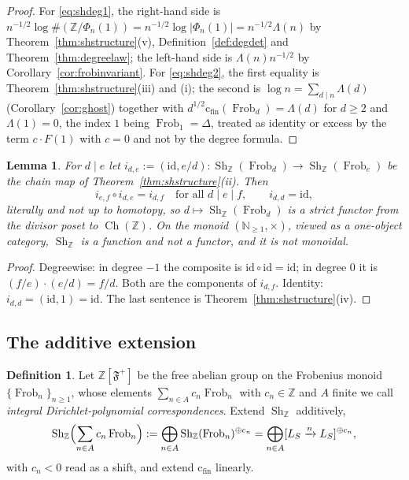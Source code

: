 \documentclass[11pt]{amsart}
\newtheorem{lemma}[theorem]{Lemma}
\theoremstyle{definition}
\newtheorem{definition}[theorem]{Definition}
\theoremstyle{remark}
\newcommand{\N}{\mathbb N}
\newcommand{\Z}{\mathbb Z}
\newcommand{\Frob}{\operatorname{Frob}}
\newcommand{\Sh}{\operatorname{Sh}}
\newcommand{\Ch}{\operatorname{Ch}}
\newcommand{\cfin}{\mathrm{c}_{\mathrm{fin}}}
\begin{document}
\begin{proof}
For \eqref{eq:shdeg1}, the right-hand side is
$n^{-1/2}\log\#(\Z/\Phi_n(1))=n^{-1/2}\log|\Phi_n(1)|=n^{-1/2}\Lambda(n)$ by
Theorem~\ref{thm:shstructure}(v), Definition~\ref{def:degdet} and
Theorem~\ref{thm:degreelaw}; the left-hand side is $\Lambda(n)n^{-1/2}$ by
Corollary~\ref{cor:frobinvariant}. For \eqref{eq:shdeg2}, the first equality is
Theorem~\ref{thm:shstructure}(iii) and (i); the second is
$\log n=\sum_{d\mid n}\Lambda(d)$ (Corollary~\ref{cor:ghost}) together with
$d^{1/2}\cfin(\Frob_d)=\Lambda(d)$ for $d\ge2$ and $\Lambda(1)=0$, the index
$1$ being $\Frob_1=\Delta$, treated as identity or excess by the term
$c\cdot F(1)$ with $c=0$ and not by the degree formula.
\end{proof}

\begin{lemma}\label{lem:shfunctor}
For $d\mid e$ let $i_{d,e}:=(\mathrm{id},e/d):\Sh_\Z(\Frob_d)\to
\Sh_\Z(\Frob_e)$ be the chain map of Theorem~\ref{thm:shstructure}(ii). Then
\begin{equation}\label{eq:strictfunctor}
  i_{e,f}\circ i_{d,e}=i_{d,f}\quad\text{for all } d\mid e\mid f,
  \qquad i_{d,d}=\mathrm{id},
\end{equation}
\emph{literally} and not up to homotopy, so $d\mapsto\Sh_\Z(\Frob_d)$ is a
strict functor from the divisor poset to $\Ch(\Z)$. On the \emph{monoid}
$(\N_{\ge1},\times)$, viewed as a one-object category, $\Sh_\Z$ is a function
and not a functor, and it is not monoidal.
\end{lemma}

\begin{proof}
Degreewise: in degree $-1$ the composite is $\mathrm{id}\circ\mathrm{id}
=\mathrm{id}$; in degree $0$ it is $(f/e)\cdot(e/d)=f/d$. Both are the
components of $i_{d,f}$. Identity: $i_{d,d}=(\mathrm{id},1)=\mathrm{id}$. The
last sentence is Theorem~\ref{thm:shstructure}(iv).
\end{proof}

\subsection{The additive extension}

\begin{definition}\label{def:dirichletpolycorr}
Let $\Z[\mathfrak F^+]$ be the free abelian group on the Frobenius monoid
$\{\Frob_n\}_{n\ge1}$, whose elements $\sum_{n\in A}c_n\Frob_n$ with
$c_n\in\Z$ and $A$ finite we call \emph{integral Dirichlet-polynomial
correspondences}. Extend $\Sh_\Z$ additively,
\begin{equation}\label{eq:shadditive}
  \Sh_\Z\Bigl(\sum_{n\in A}c_n\Frob_n\Bigr):=
   \bigoplus_{n\in A}\Sh_\Z(\Frob_n)^{\oplus c_n}
   =\bigoplus_{n\in A}[L_S\xrightarrow{n}L_S]^{\oplus c_n},
\end{equation}
with $c_n<0$ read as a shift, and extend $\cfin$ linearly.
\end{definition}
\end{document}
